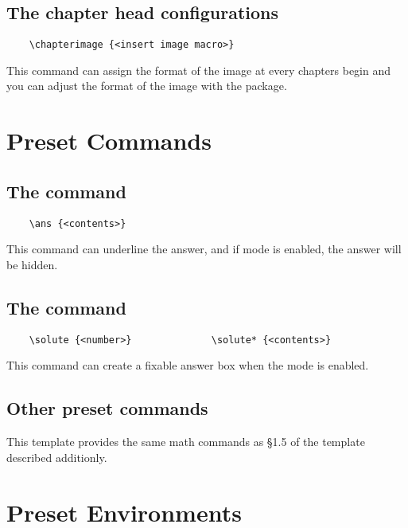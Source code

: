 \documentclass[ans,mtpro2]{litesolution}
\begin{document}
\subsection{The chapter head configurations}

\begin{verbatim}
    \chapterimage {<insert image macro>}
\end{verbatim}

This command can assign the format of the image at every chapters begin and you can adjust the format of the image with the  package.

\section{Preset Commands}

\subsection{The  command}

\begin{verbatim}
    \ans {<contents>}
\end{verbatim}
 
This command can underline the answer, and if mode  is enabled, the answer will be hidden.

\subsection{The  command}

\begin{verbatim}
    \solute {<number>}              \solute* {<contents>}
\end{verbatim}

This command can create a fixable answer box when the mode  is enabled.

\subsection{Other preset commands}

This template provides the same math commands as \S 1.5 of the template  described additionly.

\section{Preset  Environments}
\end{document}
